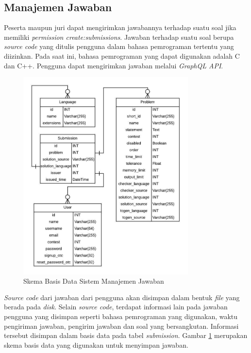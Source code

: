 \subsection{Manajemen Jawaban}

\par Peserta maupun juri dapat mengirimkan jawabannya terhadap suatu soal jika memiliki \textit{permission create:submissions}. Jawaban terhadap suatu soal berupa \textit{source code} yang ditulis pengguna dalam bahasa pemrograman tertentu yang diizinkan. Pada saat ini, bahasa pemrograman yang dapat digunakan adalah C dan C++. Pengguna dapat mengirimkan jawaban melalui \textit{GraphQL API}.

\begin{figure}[ht!]
    \centering
    \includegraphics[width=0.8\textwidth]{images/submission-schema}
    \caption{Skema Basis Data Sistem Manajemen Jawaban}
    \label{fig:submission-schema}
\end{figure}

\par \textit{Source code} dari jawaban dari pengguna akan disimpan dalam bentuk \textit{file} yang berada pada \textit{disk}. Selain \textit{source code}, terdapat informasi lain pada jawaban pengguna yang disimpan seperti bahasa pemrograman yang digunakan, waktu pengiriman jawaban, pengirim jawaban dan soal yang bersangkutan. Informasi tersebut disimpan dalam basis data pada tabel \textit{submission}. Gambar \ref{fig:submission-schema} merupakan skema basis data yang digunakan untuk menyimpan jawaban.

